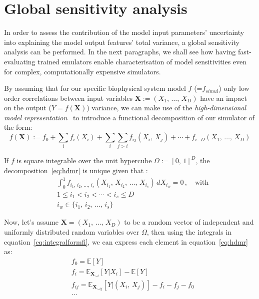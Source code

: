 %
%
%
\section{Global sensitivity analysis}
In order to assess the contribution of the model input parameters' uncertainty into explaining the model output features' total variance, a global sensitivity analysis can be performed. In the next paragraphs, we shall see how having fast-evaluating trained emulators enable characterisation of model sensitivities even for complex, computationally expensive simulators.

\vspace{0.2cm}
By assuming that for our specific biophysical system model $f$ (=$f_{simul}$) only low order correlations between input variables $\mathbf{X}:=(X_1,\,\dots,\,X_D)$ have an impact on the output ($Y=f(\mathbf{X})$) variance, we can make use of the \textit{high-dimensional model representation}~\cite{Rabitz:1999} to introduce a functional decomposition of our simulator of the form:
%
\begin{equation}\label{eq:hdmr}
    f(\mathbf{X}) := f_{0} + \sum_{i}f_{i}(X_{i}) + \sum_{i}\sum_{j>i}f_{ij}(X_{i},\,X_{j}) + \cdots + f_{i\cdots D}(X_1,\,\dots,\,X_D)
\end{equation}

\noindent
If $f$ is square integrable over the unit hypercube $\Omega := [0,\,1]^{D}$, the decomposition~\eqref{eq:hdmr} is unique given that :
%
\begin{align}\label{eq:integralformfi}
    & \int_0^1 f_{i_1,\,i_2,\,\dots,\,i_s}(X_{i_1},\,X_{i_2},\,\dots,\,X_{i_s})\,dX_{i_{w}} = 0\,,\quad\text{with} \\
    & 1 \le i_1 < i_2 < \cdots < i_s \le D \\
    & i_{w} \in \{i_1,\,i_2,\,\dots,\,i_s\}
\end{align}

\noindent
Now, let's assume $\mathbf{X} = (X_1,\,\dots,\,X_D)$ to be a random vector of independent and uniformly distributed random variables over $\Omega$, then using the integrals in equation~\eqref{eq:integralformfi}, we can express each element in equation~\eqref{eq:hdmr} as:
%
\begin{align}
    & f_{0} = \mathbb{E}[Y] \label{eq:f0var}\\
    & f_{i} = \mathbb{E}_{\mathbf{X}_{\sim i}}[Y|X_i] - \mathbb{E}[Y] \\
    & f_{ij} = \mathbb{E}_{\mathbf{X}_{\sim ij}}[Y|(X_i,\,X_j)] - f_i - f_j - f_0 \\
    &\dots
\end{align}
 
